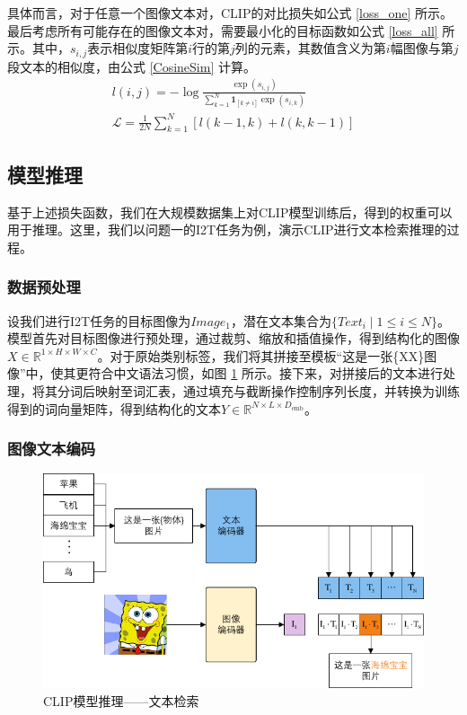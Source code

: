 \documentclass[a4paper]{zreport}
\begin{document}
具体而言，对于任意一个图像文本对，CLIP的对比损失如公式 \eqref{loss_one} 所示。最后考虑所有可能存在的图像文本对，需要最小化的目标函数如公式 \eqref{loss_all} 所示。其中，$s_{i,j}$表示相似度矩阵第$i$行的第$j$列的元素，其数值含义为第$i$幅图像与第$j$段文本的相似度，由公式 \eqref{CosineSim} 计算。
\begin{gather}
l(i,j)=-\log\frac{\exp(s_{i,j})}{\sum_{k=1}^{N} \mathbf{1}_{\left[k \ne i\right]} \exp(s_{i,k})}\label{loss_one}\\
\mathcal{L}=\frac{1}{2N}\sum_{k=1}^N[l(k-1,k)+l(k,k-1)]\label{loss_all}
\end{gather}


\subsection{模型推理} \label{infer}

基于上述损失函数，我们在大规模数据集上对CLIP模型训练后，得到的权重可以用于推理。这里，我们以问题一的I2T任务为例，演示CLIP进行文本检索推理的过程。

\subsubsection{数据预处理}

设我们进行I2T任务的目标图像为$Image_1$，潜在文本集合为$\{Text_i \mid 1 \le i \le N\}$。模型首先对目标图像进行预处理，通过裁剪、缩放和插值操作，得到结构化的图像 $X \in \mathbb{R}^{1 \times H \times W \times C}$。对于原始类别标签，我们将其拼接至模板“这是一张\{XX\}图像”中，使其更符合中文语法习惯，如图 \ref{fig:clip2} 所示。接下来，对拼接后的文本进行处理，将其分词后映射至词汇表，通过填充与截断操作控制序列长度，并转换为训练得到的词向量矩阵，得到结构化的文本$Y \in \mathbb{R}^{N \times L \times D_\mathrm{emb}}$。

\subsubsection{图像文本编码}

\begin{figure}[t]
\centering
\includegraphics[width=0.9\linewidth]{figures/clip2}
\caption{CLIP模型推理——文本检索}
\label{fig:clip2}
\end{figure}
\end{document}

